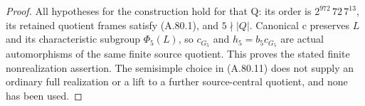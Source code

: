 \begin{proof}
All hypotheses for the construction hold for that Q: its
order is \(2^{972}\,72\,7^{13}\), its retained quotient
frames satisfy (A.80.1), and \(5\nmid|Q|\). Canonical c
preserves \(L\) and its characteristic subgroup
\(\Phi_5(L)\), so \(c_{G_5}\) and \(h_5=b_5c_{G_5}\)
are actual automorphisms of the same finite source quotient.
This proves the stated finite nonrealization assertion.
The semisimple choice in (A.80.11) does not supply an
ordinary full realization or a lift to a further source-central
quotient, and none has been used.
\end{proof}
